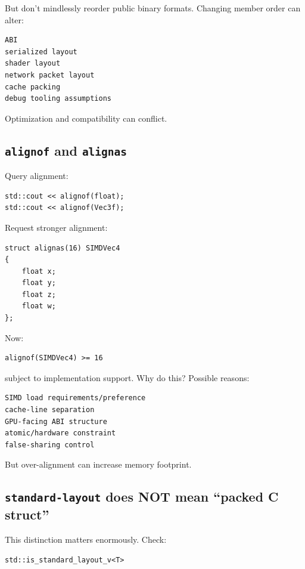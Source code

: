 But don't mindlessly reorder public binary formats. Changing member order can alter:

\begin{verbatim}
ABI
serialized layout
shader layout
network packet layout
cache packing
debug tooling assumptions
\end{verbatim}

Optimization and compatibility can conflict.

\subsection{\texorpdfstring{\texttt{alignof} and \texttt{alignas}}{alignof and alignas}}\label{05-engine-i-ch003-alignof-and-alignas}

Query alignment:

\begin{verbatim}
std::cout << alignof(float);
std::cout << alignof(Vec3f);
\end{verbatim}

Request stronger alignment:

\begin{verbatim}
struct alignas(16) SIMDVec4
{
    float x;
    float y;
    float z;
    float w;
};
\end{verbatim}

Now:

\begin{verbatim}
alignof(SIMDVec4) >= 16
\end{verbatim}

subject to implementation support. Why do this? Possible reasons:

\begin{verbatim}
SIMD load requirements/preference
cache-line separation
GPU-facing ABI structure
atomic/hardware constraint
false-sharing control
\end{verbatim}

But over-alignment can increase memory footprint.

\subsection{\texorpdfstring{\texttt{standard-layout} does NOT mean ``packed C struct''}{standard-layout does NOT mean ``packed C struct''}}\label{05-engine-i-ch003-standard-layout-does-not-mean-packed-c-struct}

This distinction matters enormously. Check:

\begin{verbatim}
std::is_standard_layout_v<T>
\end{verbatim}

